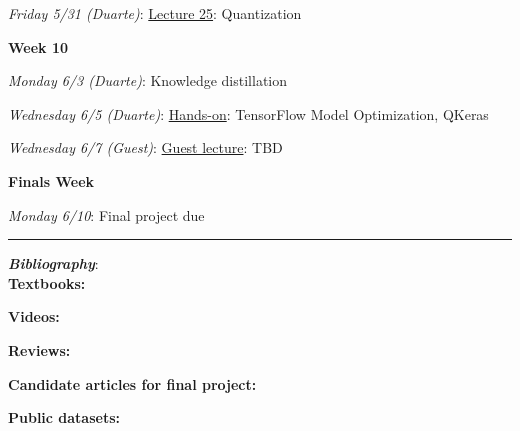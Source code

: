 \documentclass[12pt]{article}
\begin{document}
\emph{Friday 5/31 (Duarte)}: \underline{Lecture 25}: Quantization

\noindent\textbf{Week 10}

\emph{Monday 6/3 (Duarte)}: Knowledge distillation

\emph{Wednesday 6/5 (Duarte)}: \underline{Hands-on}: TensorFlow Model Optimization, QKeras

\emph{Wednesday 6/7 (Guest)}: \underline{Guest lecture}: TBD

\noindent\textbf{Finals Week}

\emph{Monday 6/10}: Final project due

\begin{center}
	\rule{\textwidth}{0.5pt}
\end{center}

\noindent\textbf{\emph{Bibliography}}:\\

\textbf{Textbooks:}

\newrefsection
\nocite{Mehta:2019,Abu-Mostafa:2012,Erdman:2021,Zeljko:2014,Calafiura:2022,Chollet:2021,Goodfellow-et-al-2016}
\printbibliography[heading=none]

\textbf{Videos:}

\newrefsection
\nocite{3blue1brown_neuralnetwork,3blue1brown_gradientdescent}
\printbibliography[heading=none]

\textbf{Reviews:}

\newrefsection
\nocite{Carleo:2019ptp,hepmllivingreview}
\printbibliography[heading=none]

\textbf{Candidate articles for final project:}

\newrefsection
\nocite{deOliveira:2015xxd,Aurisano:2016jvx,Komiske:2016rsd,Khan:2018opv,Zhou:2019,Moreno:2019neq,Ormiston:2020ele,Moreno:2021fvp,Erdmann:2019nie,Guest:2016iqz}
\printbibliography[heading=none]

\textbf{Public datasets:}

\newrefsection
\nocite{kasieczka_gregor_2019_2603256,hbb_dataset,galaxy-zoo-the-galaxy-challenge,g2net-gravitational-wave-detection,trackml-particle-identification}
\printbibliography[heading=none]
\end{document}
